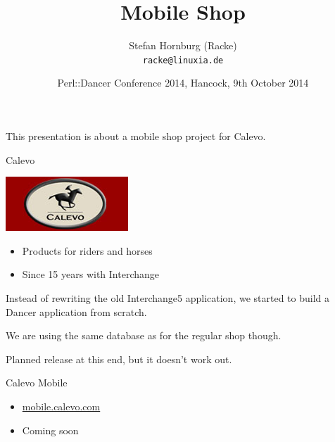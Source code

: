 \usepackage[utf8]{inputenc}
\usepackage[T1]{fontenc}
\usepackage{mathptmx}
\usepackage[scaled=.90]{helvet}
\usepackage{courier}
\usepackage{caption}
\captionsetup{labelformat=empty,labelsep=none}
\usepackage{verbatim}
\usepackage{hyperref}
\usepackage{listings}
\usepackage{ulem}
\lstset{language=Perl,basicstyle=\normalsize,tabsize=3,showstringspaces=false}

\title{Mobile Shop}
\author[racke]{Stefan Hornburg (Racke)\\  \texttt{racke@linuxia.de}}
\date{Perl::Dancer Conference 2014, Hancock, 9th October 2014}


\maketitle{}

\begin{frame}
  \titlepage
\end{frame}

\tableofcontents

This presentation is about a mobile shop project for Calevo.

\begin{frame}{Calevo}
\begin{center}
  \includegraphics{pics/calevo.jpg}
\end{center}
\begin{itemize}
\item Products for riders and horses
\item Since 15 years with Interchange 
\end{itemize}
\end{frame}

Instead of rewriting the old Interchange5 application, we started
to build a Dancer application from scratch.

We are using the same database as for the regular shop though.

Planned release at this end, but it doesn't work out.

\begin{frame}{Calevo Mobile}
\begin{itemize}
\item \url{mobile.calevo.com}
\item Coming soon
\end{itemize}
\end{frame}

